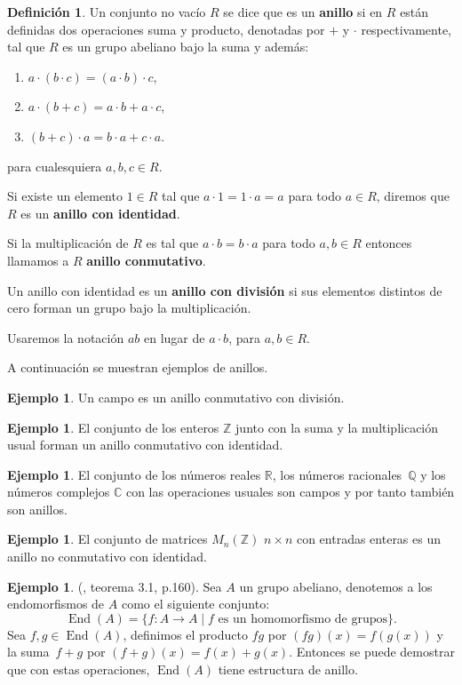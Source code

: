 \documentclass[12pt]{book}
\theoremstyle{definition}
\newtheorem{definition}[theorem]{Definición}
\newtheorem{example}[theorem]{Ejemplo}
\DeclareMathOperator{\End}{End}
\newcounter{in}
\newcounter{ini}
\begin{document}
\begin{definition}
  Un conjunto no vacío $R$ se dice que es un \textbf{anillo} si en $R$
  están definidas dos operaciones suma y producto, denotadas por $+$ y
  $\cdot$ respectivamente, tal que $R$ es un grupo abeliano bajo la suma y además:
  \begin{enumerate}
  \item $a\cdot (b\cdot c)=(a\cdot b)\cdot c$,
  \item $a\cdot (b+c)=a\cdot b+a\cdot c$,
  \item $(b+c)\cdot a=b\cdot a+c\cdot a$.
  \end{enumerate}
  para cualesquiera $a,b,c \in R$.

  Si existe un elemento $1\in R$ tal que $a\cdot 1=1\cdot a=a$ para todo
  $a\in R$, diremos que $R$ es un \textbf{anillo con identidad}.
  
  Si la multiplicación de $R$ es tal que $a\cdot b=b\cdot a$ para todo
  $a,b\in R$ entonces llamamos a $R$ \textbf{anillo conmutativo}.
  
  Un anillo con identidad es un \textbf{anillo con división} si sus
  elementos distintos de cero forman un grupo bajo la multiplicación.

  Usaremos la notación $ab$ en lugar de $a\cdot b$, para $a,b\in R$.
\end{definition}
A continuación se muestran ejemplos de anillos.
\begin{example}
  Un campo es un anillo conmutativo con división.
\end{example}

\begin{example}
  El conjunto de los enteros $\mathbb{Z}$ junto con la suma y la
  multiplicación usual forman un anillo conmutativo con identidad.
\end{example}

\begin{example}
  El conjunto de los números reales $\mathbb{R}$, los números
  racionales~$\mathbb{Q}$ y los números complejos $\mathbb{C}$ con las
  operaciones usuales son campos y por tanto también son anillos.
\end{example}

\begin{example}
  El conjunto de matrices $M_{n}(\mathbb{Z})$ $n\times n$ con
  entradas enteras es un anillo no conmutativo con identidad.
\end{example}

\begin{example}{\normalfont (\cite{jacobson2012basic}, teorema 3.1, p.160).}
  Sea $A$ un grupo abeliano, denotemos a los endomorfismos de $A$ como
  el siguiente conjunto: 
  \begin{equation*}
    \End(A)=\{f:A\rightarrow A\mid f\mbox{ es un homomorfismo de grupos}\}.
    \label{endomorfismos}
  \end{equation*}
  Sea $f,g\in\End(A)$, definimos el producto $fg$ por $(fg)(x)=f(g(x))$ y
  la suma~$f+g$ por $(f+g)(x)=f(x)+g(x)$. Entonces se puede demostrar
  que con estas operaciones, $\End(A)$ tiene estructura de anillo.
\end{example}
\end{document}
